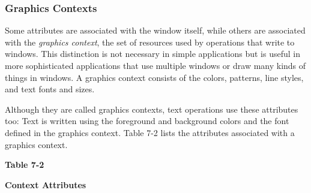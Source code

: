 \subsubsection{Graphics Contexts}

Some attributes are associated with the window itself, while others are
associated with the \textit{graphics context}, the set of resources
used by operations that write to windows. This distinction is not
necessary in simple applications but is useful in more sophisticated
applications that use multiple windows or draw many kinds of things in
windows. A graphics context consists of the colors, patterns, line
styles, and text fonts and sizes.

Although they are called graphics contexts, text operations use these
attributes too: Text is written using the foreground and background
colors and the font defined in the graphics context. Table 7-2 lists
the attributes associated with a graphics context.

\pagebreak

{\centering\sffamily\bfseries
Table 7-2
\par}

{\centering\sffamily\bfseries
Context Attributes
\par}

